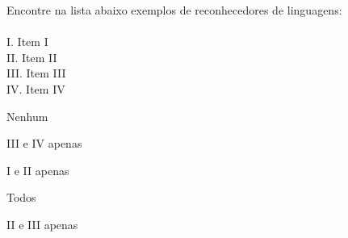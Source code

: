 \question[10]
Encontre na lista abaixo exemplos de reconhecedores de linguagens:\\
\\
I. Item I\\
II. Item II\\
III. Item III\\
IV. Item IV
\\
\begin{choices}
\item Nenhum %
\item III e IV apenas
\item I e II apenas
\item Todos
\item II e III apenas
\end{choices}
\answerline


